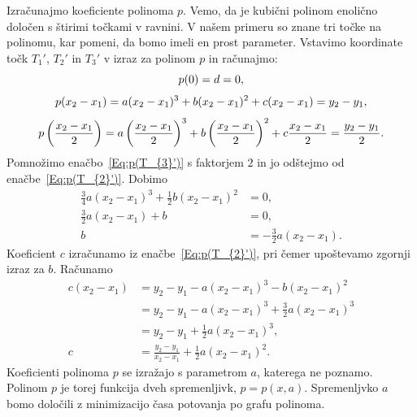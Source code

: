 \documentclass[a4paper]{article}
\begin{document}
Izračunajmo koeficiente polinoma $p$. Vemo, da je kubični polinom enolično določen s štirimi točkami v ravnini. V našem primeru so znane tri točke na polinomu, kar pomeni, da bomo imeli en prost parameter. Vstavimo koordinate točk $T_{1}'$, $T_{2}'$ in $T_{3}'$ v izraz za polinom $p$ in računajmo:
\begin{equation}
\label{Eq:p(T_{1}')}
p(0) = d = 0,
\end{equation}
%
\begin{equation}
\label{Eq:p(T_{2}')}
p(x_2-x_1) = a(x_2-x_1)^3+b(x_2-x_1)^2+c(x_2-x_1) = y_2-y_1,
\end{equation}
%
\begin{equation}
\label{Eq:p(T_{3}')}
p \left(\frac{x_2-x_1}{2} \right) = a \left(\frac{x_2-x_1}{2} \right)^3+b \left(\frac{x_2-x_1}{2} \right)^2+c \frac{x_2-x_1}{2} = \frac{y_2-y_1}{2}.
\end{equation}
%
Pomnožimo enačbo~\eqref{Eq:p(T_{3}')} s faktorjem $2$ in jo odštejmo od enačbe~\eqref{Eq:p(T_{2}')}. Dobimo
\begin{align}
\frac{3}{4} a(x_2-x_1)^3 + \frac{1}{2} b(x_2-x_1)^2 &= 0, \nonumber \\
\frac{3}{2} a(x_2-x_1) + b &= 0, \nonumber \\
b &= -\frac{3}{2} a(x_2-x_1).
\end{align}
%
Koeficient $c$ izračunamo iz enačbe~\eqref{Eq:p(T_{2}')}, pri čemer upoštevamo zgornji izraz za $b$. Računamo
\begin{align}
c(x_2-x_1) &= y_2 - y_1 - a(x_2-x_1)^3 - b(x_2-x_1)^2 \nonumber \\
 &= y_2 - y_1 - a(x_2-x_1)^3 + \frac{3}{2} a(x_2-x_1)^3 \nonumber \\
 &= y_2 - y_1 + \frac{1}{2} a(x_2-x_1)^3, \nonumber \\
c &= \frac{y_2-y_1}{x_2-x_1} + \frac{1}{2} a(x_2-x_1)^2.
\end{align}
%
Koeficienti polinoma $p$ se izražajo s parametrom $a$, katerega ne poznamo. Polinom $p$ je torej funkcija dveh spremenljivk, $p = p(x,a)$. Spremenljvko $a$ bomo določili z minimizacijo časa potovanja po grafu polinoma.
\end{document}
